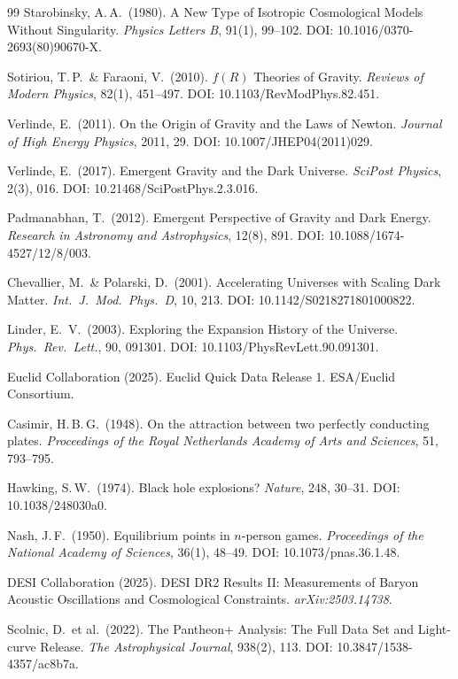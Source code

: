 \documentclass[aps,prd,twocolumn,superscriptaddress,nofootinbib]{revtex4-2}
\begin{document}
\begin{thebibliography}{99}
Starobinsky, A.\,A.\ (1980).
A New Type of Isotropic Cosmological Models Without Singularity.
\textit{Physics Letters B}, 91(1), 99--102.
DOI: 10.1016/0370-2693(80)90670-X.

Sotiriou, T.\,P.\ \& Faraoni, V.\ (2010).
$f(R)$ Theories of Gravity.
\textit{Reviews of Modern Physics}, 82(1), 451--497.
DOI: 10.1103/RevModPhys.82.451.

Verlinde, E.\ (2011).
On the Origin of Gravity and the Laws of Newton.
\textit{Journal of High Energy Physics}, 2011, 29.
DOI: 10.1007/JHEP04(2011)029.

Verlinde, E.\ (2017).
Emergent Gravity and the Dark Universe.
\textit{SciPost Physics}, 2(3), 016.
DOI: 10.21468/SciPostPhys.2.3.016.

Padmanabhan, T.\ (2012).
Emergent Perspective of Gravity and Dark Energy.
\textit{Research in Astronomy and Astrophysics}, 12(8), 891.
DOI: 10.1088/1674-4527/12/8/003.

Chevallier, M.\ \& Polarski, D.\ (2001).
Accelerating Universes with Scaling Dark Matter.
\textit{Int.\ J.\ Mod.\ Phys.\ D}, 10, 213.
DOI: 10.1142/S0218271801000822.

Linder, E.~V.\ (2003).
Exploring the Expansion History of the Universe.
\textit{Phys.\ Rev.\ Lett.}, 90, 091301.
DOI: 10.1103/PhysRevLett.90.091301.

Euclid Collaboration (2025).
Euclid Quick Data Release 1.
ESA/Euclid Consortium.

Casimir, H.\,B.\,G.\ (1948).
On the attraction between two perfectly conducting plates.
\textit{Proceedings of the Royal Netherlands Academy of Arts and Sciences}, 51, 793--795.

Hawking, S.\,W.\ (1974).
Black hole explosions?
\textit{Nature}, 248, 30--31.
DOI: 10.1038/248030a0.

Nash, J.\,F.\ (1950).
Equilibrium points in $n$-person games.
\textit{Proceedings of the National Academy of Sciences}, 36(1), 48--49.
DOI: 10.1073/pnas.36.1.48.

DESI Collaboration (2025).
DESI DR2 Results II: Measurements of Baryon Acoustic Oscillations and Cosmological Constraints.
\textit{arXiv:2503.14738}.

Scolnic, D.\ et al.\ (2022).
The Pantheon+ Analysis: The Full Data Set and Light-curve Release.
\textit{The Astrophysical Journal}, 938(2), 113.
DOI: 10.3847/1538-4357/ac8b7a.


\end{thebibliography}
\end{document}
